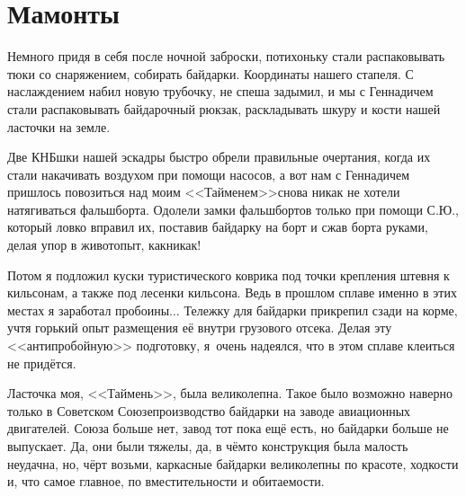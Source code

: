 \chapter{Мамонты} 
\vepsianrose

Немного придя в себя после ночной заброски, потихоньку стали распаковывать тюки со снаряжением, собирать байдарки. Координаты нашего стапеля\mdash \CoordsGorunSixteenStapel. С наслаждением  набил новую трубочку, не спеша задымил, и мы с Геннадичем стали распаковывать байдарочный рюкзак, раскладывать шкуру и кости нашей ласточки на земле. 

Две КНБ\sdash шки нашей эскадры быстро обрели правильные очертания, когда их стали накачивать воздухом при помощи насосов, а вот нам с Геннадичем пришлось повозиться над моим <<Тайменем>>\mdash снова никак не хотели натягиваться фальшборта. Одолели замки фальшбортов только при помощи С.Ю., который ловко вправил их, поставив байдарку на борт и сжав борта руками, делая упор в живот\mdash опыт, как\sdash никак! 

\newpage
Потом я подложил куски туристического коврика под точки крепления штевня к кильсонам, а также под лесенки кильсона. Ведь в прошлом сплаве именно в этих местах я заработал пробоины$\ldots$ Тележку для байдарки прикрепил сзади на корме, учтя горький опыт размещения её внутри грузового отсека. Делая эту <<антипробойную>> подготовку, я~очень надеялся, что в этом сплаве клеиться не придётся. 

Ласточка моя, <<Таймень>>, была великолепна. Такое было возможно наверно только в Советском Союзе\mdash производство байдарки на заводе авиационных двигателей. Союза больше нет, завод тот пока ещё есть, но байдарки больше не выпускает. Да, они были тяжелы, да, в чём\sdash то конструкция была малость неудачна, но, чёрт возьми, каркасные байдарки великолепны по красоте, ходкости и, что самое главное, по вместительности и обитаемости.

